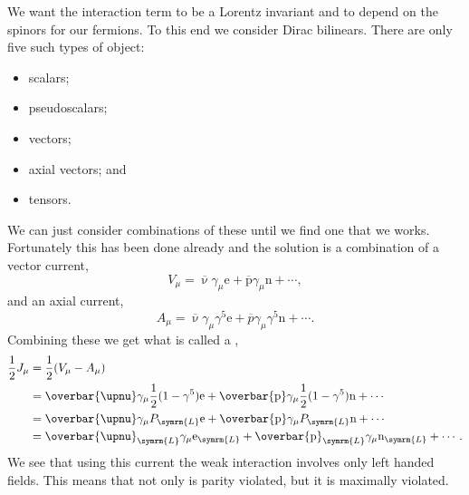 \documentclass[fleqn]{NotesClass}
\newcommand{\Pparticle}[1]{\mathrm{#1}}
\newcommand{\Pex}{\ensuremath{\Pparticle{e}}}
\newcommand{\Pnu}{\ensuremath{\upnu}}
\newcommand{\Pp}{\ensuremath{\Pparticle{p}}}
\newcommand{\Pn}{\ensuremath{\Pparticle{n}}}
\newcommand{\diracadjoint}[1]{\overbar{#1}}
\newcommand{\Left}{\symrm{L}}
\begin{document}
    We want the interaction term to be a Lorentz invariant and to depend on the spinors for our fermions.
    To this end we consider Dirac bilinears.
    There are only five such types of object:
    \begin{itemize}
        \item scalars;
        \item pseudoscalars;
        \item vectors;
        \item axial vectors; and
        \item tensors.
    \end{itemize}
    We can just consider combinations of these until we find one that we works.
    Fortunately this has been done already and the solution is a combination of a vector current,
    \begin{equation}
        V_\mu = \diracadjoint{\Pnu}\gamma_\mu \Pex + \diracadjoint{\Pp} \gamma_\mu \Pn + \dotsb,
    \end{equation}
    and an axial current,
    \begin{equation}
        A_\mu = \diracadjoint{\Pnu} \gamma_\mu \gamma^5 \Pex + \diracadjoint{p} \gamma_\mu \gamma^5 \Pn + \dotsb.
    \end{equation}
    Combining these we get what is called a ,
    \begin{align}
        \frac{1}{2}J_\mu &= \frac{1}{2}(V_\mu - A_\mu)\\
        &= \diracadjoint{\Pnu}\gamma_\mu \frac{1}{2}(1 - \gamma^5) \Pex + \diracadjoint{\Pp}\gamma_\mu \frac{1}{2}(1 - \gamma^5)\Pn + \dotsb\\
        &= \diracadjoint{\Pnu}\gamma_\mu P_{\Left} \Pex + \diracadjoint{\Pp}\gamma_\mu P_{\Left} \Pn + \dotsb\\
        &= \diracadjoint{\Pnu}_{\Left} \gamma_\mu \Pex_{\Left} + \diracadjoint{\Pp}_{\Left} \gamma_\mu \Pn_{\Left} + \dotsb.
    \end{align}
    We see that using this current the weak interaction involves only left handed fields.
    This means that not only is parity violated, but it is maximally violated.
    
\end{document}
